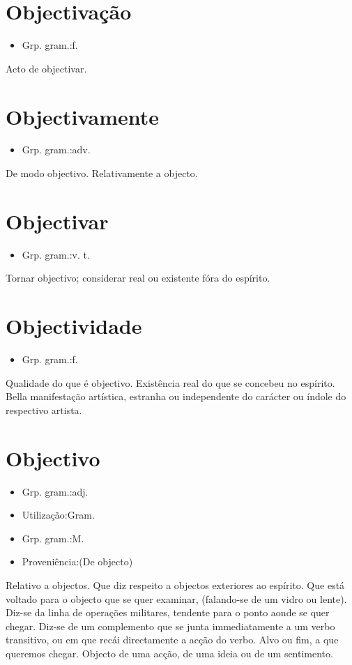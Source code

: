 \section{Objectivação}
\begin{itemize}
\item {Grp. gram.:f.}
\end{itemize}
Acto de objectivar.
\section{Objectivamente}
\begin{itemize}
\item {Grp. gram.:adv.}
\end{itemize}
De modo objectivo.
Relativamente a objecto.
\section{Objectivar}
\begin{itemize}
\item {Grp. gram.:v. t.}
\end{itemize}
Tornar objectivo; considerar real ou existente fóra do espírito.
\section{Objectividade}
\begin{itemize}
\item {Grp. gram.:f.}
\end{itemize}
Qualidade do que é objectivo.
Existência real do que se concebeu no espírito.
Bella manifestação artística, estranha ou independente do carácter ou índole do respectivo artista.
\section{Objectivo}
\begin{itemize}
\item {Grp. gram.:adj.}
\end{itemize}
\begin{itemize}
\item {Utilização:Gram.}
\end{itemize}
\begin{itemize}
\item {Grp. gram.:M.}
\end{itemize}
\begin{itemize}
\item {Proveniência:(De \textunderscore objecto\textunderscore )}
\end{itemize}
Relativo a objectos.
Que diz respeito a objectos exteriores ao espírito.
Que está voltado para o objecto que se quer examinar, (falando-se de um vidro ou lente).
Diz-se da linha de operações militares, tendente para o ponto aonde se quer chegar.
Diz-se de um complemento que se junta immediatamente a um verbo transitivo, ou em que recái directamente a acção do verbo.
Alvo ou fim, a que queremos chegar.
Objecto de uma acção, de uma ideia ou de um sentimento.
